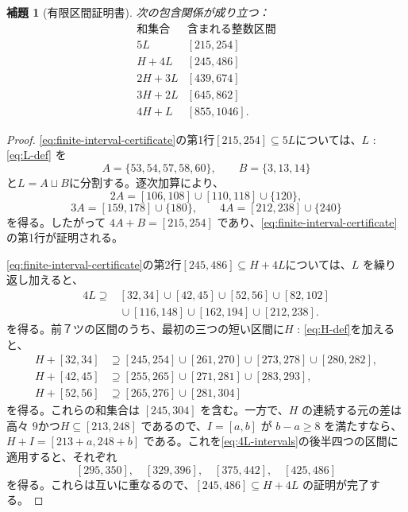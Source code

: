 \documentclass[12pt]{ltjsarticle}
\theoremstyle{plain}
\newtheorem{lemma}[theorem]{補題}
\begin{document}
\begin{lemma}[有限区間証明書]\label{lem:finitefive}
次の包含関係が成り立つ：
\begin{equation}\label{eq:finite-interval-certificate}
\begin{array}{c|c}
\text{和集合}&\text{含まれる整数区間}\\ \hline
5L &[215,254]\\
H+4L &[245,486]\\
2H+3L &[439,674]\\
3H+2L &[645,862]\\
4H+L &[855,1046].
\end{array}
\end{equation}
\end{lemma}

\begin{proof}
\eqref{eq:finite-interval-certificate}の第1行$[215,254]\subseteq5L$については、$L$ : \eqref{eq:L-def} を
\[
 A=\{53,54,57,58,60\},\qquad B=\{3,13,14\}
\]
と$L=A\sqcup B$に分割する。逐次加算により、
\[
 2A=[106,108]\cup[110,118]\cup\{120\},
\]
\[
 3A=[159,178]\cup\{180\},\qquad
 4A=[212,238]\cup\{240\}
\]
を得る。したがって $4A+B=[215,254]$ であり、\eqref{eq:finite-interval-certificate}の第1行が証明される。

\eqref{eq:finite-interval-certificate}の第2行$[245,486]\subseteq H+4L$については、$L$ を繰り返し加えると、
\begin{equation}\label{eq:4L-intervals}
\begin{split}
4L\supseteq{}&[32,34]\cup[42,45]\cup[52,56]\cup[82,102]\\
 &{}\cup[116,148]\cup[162,194]\cup[212,238].
\end{split}
\end{equation}
を得る。前７ツの区間のうち、最初の三つの短い区間に$H$ : \eqref{eq:H-def}を加えると、
\[
\begin{aligned}
H+[32,34]&\supseteq[245,254]\cup[261,270]
 \cup[273,278]\cup[280,282],\\
H+[42,45]&\supseteq[255,265]\cup[271,281]\cup[283,293],\\
H+[52,56]&\supseteq[265,276]\cup[281,304]
\end{aligned}
\]
を得る。これらの和集合は $[245,304]$ を含む。一方で、$H$ の連続する元の差は高々 $9$かつ$H\subseteq[213,248]$ であるので、$I=[a,b]$ が $b-a\geq8$ を満たすなら、
$H+I=[213+a,248+b]$ である。これを\eqref{eq:4L-intervals}の後半四つの区間に適用すると、それぞれ
\[
 [295,350],\quad[329,396],\quad[375,442],\quad[425,486]
\]
を得る。これらは互いに重なるので、$[245,486]\subseteq H+4L$ の証明が完了する。


\end{proof}
\end{document}
